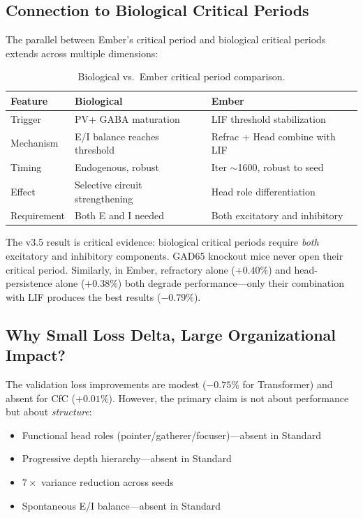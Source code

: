 \documentclass[11pt]{article}
\begin{document}
\subsection{Connection to Biological Critical Periods}

The parallel between Ember's critical period and biological critical periods extends across multiple dimensions:

\begin{table}[h]
\centering
\caption{Biological vs.\ Ember critical period comparison.}
\label{tab:bio-comparison}
\begin{tabular}{lll}
\toprule
\textbf{Feature} & \textbf{Biological} \cite{hensch2005critical} & \textbf{Ember} \\
\midrule
Trigger & PV+ GABA maturation & LIF threshold stabilization \\
Mechanism & E/I balance reaches threshold & Refrac + Head combine with LIF \\
Timing & Endogenous, robust & Iter $\sim$1600, robust to seed \\
Effect & Selective circuit strengthening & Head role differentiation \\
Requirement & Both E and I needed & Both excitatory and inhibitory \\
\bottomrule
\end{tabular}
\end{table}

The v3.5 result is critical evidence: biological critical periods require \emph{both} excitatory and inhibitory components. GAD65 knockout mice never open their critical period. Similarly, in Ember, refractory alone ($+0.40\%$) and head-persistence alone ($+0.38\%$) both degrade performance---only their combination with LIF produces the best results ($-0.79\%$).

\subsection{Why Small Loss Delta, Large Organizational Impact?}

The validation loss improvements are modest ($-0.75\%$ for Transformer) and absent for CfC ($+0.01\%$). However, the primary claim is not about performance but about \emph{structure}:
\begin{itemize}
    \item Functional head roles (pointer/gatherer/focuser)---absent in Standard
    \item Progressive depth hierarchy---absent in Standard
    \item $7\times$ variance reduction across seeds
    \item Spontaneous E/I balance---absent in Standard
\end{itemize}
\end{document}
